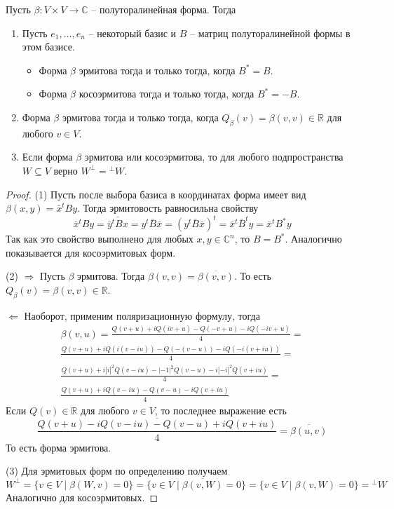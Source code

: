 \begin{claim}\label{claim::CSymBil}
Пусть $\beta\colon V\times V\to \mathbb C$ -- полуторалинейная форма. Тогда
\begin{enumerate}
\item Пусть $e_1,\ldots,e_n$ -- некоторый базис и $B$ -- матриц полуторалинейной формы в этом базисе.
\begin{itemize}
\item Форма $\beta$ эрмитова тогда и только тогда, когда $B^* = B$.
\item Форма $\beta$ косоэрмитова тогда и только тогда, когда $B^* = - B$.
\end{itemize}
\item Форма $\beta$ эрмитова тогда и только тогда, когда $Q_\beta(v) = \beta(v,v)\in\mathbb R$ для любого $v\in V$.
\item Если форма $\beta$ эрмитова или косоэрмитова, то для любого подпространства $W\subseteq V$ верно $W^\bot = {}^\bot W$.
\end{enumerate}
\end{claim}
\begin{proof}
(1) Пусть после выбора базиса в координатах форма имеет вид $\beta(x, y) = \bar x^t B y$. Тогда эрмитовость равносильна свойству
\[
\bar x^t B y = \overline{\bar y^t B x} = y^t \bar B \bar x = (y^t \bar B \bar x)^t = \bar x^t \bar B^t y = \bar x^t B^* y
\]
Так как это свойство выполнено для любых $x,y\in \mathbb C^n$, то $B = B^*$. Аналогично показывается для косоэрмитовых форм.

(2) $\Rightarrow$ Пусть $\beta$ эрмитова. Тогда $\beta(v,v) = \overline{\beta(v,v)}$. То есть $Q_\beta(v) = \beta(v,v)\in \mathbb R$.

$\Leftarrow$ Наоборот, применим поляризационную формулу, тогда
\begin{gather*}
\beta(v,u) = \frac{Q(v+u) + iQ(iv+u) - Q(-v+u) - iQ(-iv+u)}{4}=\\
\frac{Q(v+u) + iQ(i(v-iu)) - Q(-(v-u)) - iQ(-i(v+iu))}{4}=\\
\frac{Q(v+u) + i|i|^2Q(v-iu) -|-1|^2 Q(v-u) - i|-i|^2Q(v+iu)}{4}=\\
\frac{Q(v+u) + iQ(v-iu) - Q(v-u) - iQ(v+iu)}{4}
\end{gather*}
Если $Q(v)\in \mathbb R$ для любого $v\in V$, то последнее выражение есть
\[
\overline{\frac{Q(v+u) - iQ(v-iu) - Q(v-u) + iQ(v+iu)}{4}} = \overline{\beta(u,v)}
\]
То есть форма эрмитова.

(3) Для эрмитовых форм по определению получаем
\[
W^\bot = \{v\in V\mid \beta(W, v) = 0\} = \{v\in V\mid \overline{\beta(v, W)} = 0\} = \{v\in V\mid \beta(v, W) = 0\} = {}^\bot W
\]
Аналогично для косоэрмитовых.
\end{proof}

